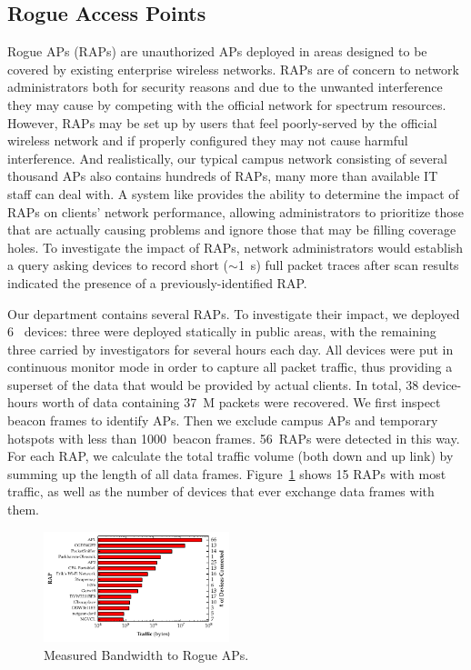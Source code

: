 \subsection{Rogue Access Points}
\label{subsec-rogue}

Rogue APs (RAPs) are unauthorized APs deployed in areas designed to be
covered by existing enterprise wireless networks. RAPs are of concern to
network administrators both for security reasons and due to the unwanted
interference they may cause by competing with the official network for
spectrum resources. However, RAPs may be set up by users that feel
poorly-served by the official wireless network and if properly configured
they may not cause harmful interference. And realistically, our typical
campus network consisting of several thousand APs also contains hundreds of
RAPs, many more than available IT staff can deal with. A system like
\PS{} provides the ability to determine the impact of RAPs on clients'
network performance, allowing administrators to prioritize those that are
actually causing problems and ignore those that may be filling coverage
holes. To investigate the impact of RAPs, network administrators would
establish a \PS{} query asking devices to record short ($\sim$1~s) full packet
traces after scan results indicated the presence of a previously-identified
RAP.

Our department contains several RAPs. To investigate their impact, we
deployed 6~\PS{} devices: three were deployed statically in public areas,
with the remaining three carried by investigators for several hours each day.
All devices were put in continuous monitor mode in order to capture all
packet traffic, thus providing a superset of the data that would be provided
by actual \PS{} clients. In total, 38 device-hours worth of data containing
37~M packets were recovered. We first inspect beacon frames to identify APs.
Then we exclude campus APs and temporary hotspots with less than 1000~beacon
frames. 56~RAPs were detected in this way. For each RAP, we calculate the
total traffic volume (both down and up link) by summing up the length of all
data frames. Figure~\ref{fig:rap} shows 15 RAPs with most traffic, as well as
the number of devices that ever exchange data frames with them.


\begin{figure}[t!]
  \centering
  \includegraphics[width=0.48\textwidth]{./figures/RAPTrafficGraph.pdf}
  \vspace*{-10mm}
  \caption{Measured Bandwidth to Rogue APs.}
  \label{fig:rap}
  \vspace*{-4mm}
\end{figure}

